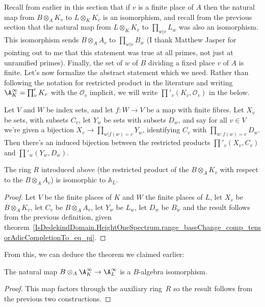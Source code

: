 Recall from earlier in this section that if $v$ is a finite place of $A$ then the natural map from
$B\otimes_A K_v$ to $L\otimes_KK_v$ is an isomorphism, and recall from the previous section
that the natural map from $L\otimes_KK_v$ to $\prod_{w|v}L_w$ was also an isomorphism.
This isomorphism sends $B\otimes_A A_v$ to $\prod_{w|v}B_w$ (I thank Matthew Jasper for
pointing out to me that this statement was true at all primes, not just at unramified primes).
Finally, the set of $w$ of $B$ dividing a fixed place $v$ of $A$ is finite.
Let's now formalize the abstract statement which we need. Rather than following the
notation for restricted product in the literature and writing $\A_K^\infty=\prod'_vK_v$
with the $\mathcal{O}_v$ implicit, we will write $\prod'_v(K_v,\mathcal{O}_v)$ in the below.

\begin{definition}
  \label{RestrictedProduct.relabelIso}
  Let $V$ and $W$ be index sets, and let $f:W\to V$ be a map with finite fibres.
  Let $X_v$ be sets, with subsets $C_v$, let $Y_w$ be sets with subsets $D_w$,
  and say for all $v\in V$ we're given a bijection $X_v\to\prod_{w|f(w)=v}Y_w$,
  identifying $C_v$ with $\prod_{w:f(w)=v}D_w$. Then there's an induced bijection between
  the restricted products $\prod'_v(X_v,C_v)$ and $\prod'_w(Y_w,D_w)$.
\end{definition}

\begin{corollary}
  \label{IsDedekindDomain.FiniteAdeleRing.IntegraltensorProductAlgEquiv_aux2}
  The ring $R$ introduced above (the restricted
  product of the $B\otimes_A K_v$ with respect to the $B\otimes_A A_v$)
  is isomorphic to $\mathbb{A}_L$.
\end{corollary}
\begin{proof} Let $V$ be the finite places of $K$ and $W$ the finite places of $L$,
  let $X_v$ be $B\otimes_A K_v$, let $C_v$ be $B\otimes_A A_v$, let $Y_w$ be $L_w$,
  let $D_w$ be $B_w$ and the result follows from the previous definition, given
  theorem~\ref{IsDedekindDomain.HeightOneSpectrum.range_baseChange_comp_tensorAdicCompletionTo_eq_pi}.
\end{proof}
From this, we can deduce the theorem we claimed earlier:

\begin{theorem}
  \label{IsDedekindDomain.FiniteAdeleRing.baseChangeIntegralAlgEquiv}
  The natural map $B\otimes_A\A_K^\infty\to\A_L^\infty$ is a $B$-algebra
  isomorphism.
\end{theorem}
\begin{proof}
  This map factors through the auxiliary ring~$R$ so the result follows
  from the previous two constructions.
\end{proof}

